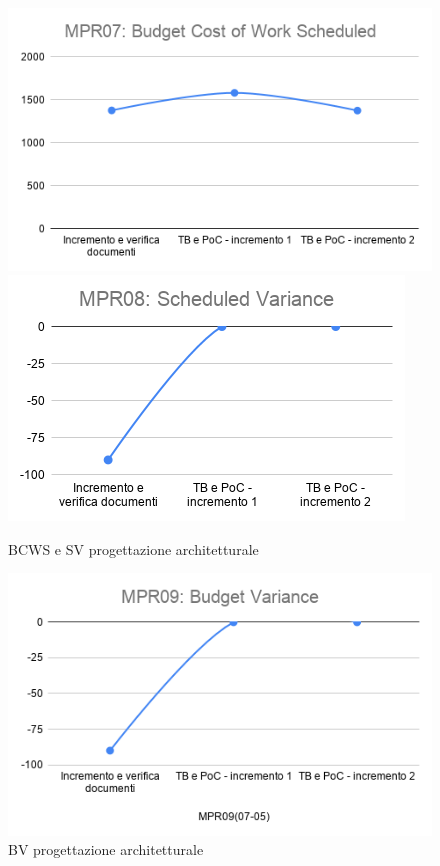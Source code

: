 \begin{figure}[h!]
	\includegraphics[scale=0.5]{Immagini/BCWS_PArchitetturale.png}\quad
 	\includegraphics[scale=0.6]{Immagini/SV_PArchitetturale.png}
 	\caption{BCWS e SV progettazione architetturale}
 	\label{fig:SV_PArchitetturale}
\end{figure}
\begin{figure}[h!]
	\centering
	\includegraphics[scale=0.6]{Immagini/BV_PArchitetturale.png}
	\caption{BV progettazione architetturale}
	\label{fig:BV_PArchitetturale}
\end{figure}
